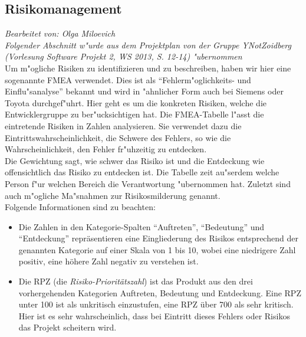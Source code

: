 \subsection{Risikomanagement}

\textit{Bearbeitet von: Olga Miloevich}\\

\textit{Folgender Abschnitt w"urde aus dem Projektplan von der Gruppe YNotZoidberg (Vorlesung Software Projekt 2, WS 2013, S. 12-14) "ubernommen}\\

Um m"ogliche Risiken zu identifizieren und zu beschreiben, haben wir hier eine sogenannte FMEA verwendet. Dies ist als ``Fehlerm"oglichkeits- und Einflu"sanalyse'' bekannt und wird in "ahnlicher Form auch bei Siemens oder Toyota durchgef"uhrt. Hier geht es um die konkreten Risiken, welche die Entwicklergruppe zu ber"ucksichtigen hat. Die FMEA-Tabelle l"asst die eintretende Risiken in Zahlen analysieren. Sie verwendet dazu die Eintrittswahrscheinlichkeit, die Schwere des Fehlers, so wie die Wahrscheinlichkeit, den Fehler fr"uhzeitig zu entdecken.\\
Die Gewichtung sagt, wie schwer das Risiko ist und die Entdeckung wie offensichtlich das Risiko zu entdecken ist. Die Tabelle zeit au"serdem welche Person f"ur welchen Bereich die Verantwortung "ubernommen hat. Zuletzt sind auch m"ogliche Ma"snahmen zur Risikosmilderung genannt. \\
Folgende Informationen sind zu beachten:\\
\begin{itemize}
 \item Die Zahlen in den Kategorie-Spalten ``Auftreten'', ``Bedeutung'' und ``Entdeckung'' repr\"{a}sentieren eine Eingliederung des Risikos entsprechend der genannten Kategorie auf einer Skala von 1 bis 10, wobei eine niedrigere Zahl positiv, eine h\"{o}here Zahl negativ zu verstehen ist.
 \item Die RPZ (die \textit{Risiko-Priorit\"{a}tszahl}) ist das Produkt aus den drei vorhergehenden Kategorien Auftreten, Bedeutung und Entdeckung.\newline
 Eine RPZ unter 100 ist als unkritisch einzustufen, eine RPZ \"{u}ber 700 als sehr kritisch. Hier ist es sehr wahrscheinlich, dass bei Eintritt dieses Fehlers oder Risikos das Projekt scheitern wird.
\end{itemize}

